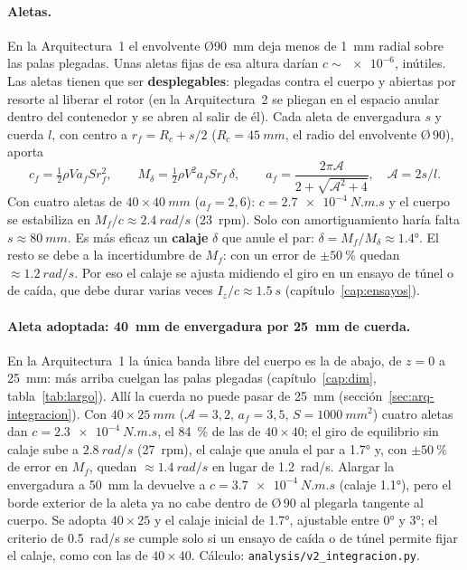\paragraph{Aletas.} En la Arquitectura~1 el envolvente Ø\SI{90}{mm} deja menos de
\SI{1}{mm} radial sobre las palas plegadas. Unas aletas fijas de esa altura darían
$c\sim\num{e-6}$, inútiles. Las aletas tienen que ser \textbf{desplegables}: plegadas contra
el cuerpo y abiertas por resorte al liberar el rotor (en la Arquitectura~2 se pliegan en el
espacio anular dentro del contenedor y se abren al salir de él). Cada aleta de envergadura $s$ y cuerda $l$, con centro a $r_f=R_c+s/2$ ($R_c=\SI{45}{mm}$, el radio del envolvente Ø\,90), aporta
\begin{equation}
  c_f=\tfrac12\rho V a_fSr_f^2,\qquad
  M_\delta=\tfrac12\rho V^2a_fSr_f\,\delta,\qquad
  a_f=\frac{2\pi\mathcal A}{2+\sqrt{\mathcal A^2+4}},\quad\mathcal A=2s/l .
\end{equation}
Con cuatro aletas de $40\times\SI{40}{mm}$ ($a_f=2{,}6$): $c=\SI{2.7e-4}{N.m.s}$ y el
cuerpo se estabiliza en $M_f/c\approx\SI{2.4}{rad/s}$ (23~rpm). Solo con amortiguamiento
haría falta $s\approx\SI{80}{mm}$. Es más eficaz un \textbf{calaje} $\delta$ que anule el
par: $\delta=M_f/M_\delta\approx\ang{1.4}$. El resto se debe a la incertidumbre de $M_f$:
con un error de $\pm\SI{50}{\percent}$ quedan $\approx\SI{1.2}{rad/s}$. Por eso el calaje
se ajusta midiendo el giro en un ensayo de túnel o de caída, que debe durar varias veces
$I_z/c\approx\SI{1.5}{s}$ (capítulo~\ref{cap:ensayos}).

\paragraph{Aleta adoptada: \SI{40}{mm} de envergadura por \SI{25}{mm} de cuerda.} En la
Arquitectura~1 la única banda libre del cuerpo es la de abajo, de $z=0$ a \SI{25}{mm}: más
arriba cuelgan las palas plegadas (capítulo~\ref{cap:dim}, tabla~\ref{tab:largo}). Allí la
cuerda no puede pasar de \SI{25}{mm} (sección~\ref{sec:arq-integracion}). Con $40\times\SI{25}{mm}$
($\mathcal A=3{,}2$, $a_f=3{,}5$, $S=\SI{1000}{mm^2}$) cuatro aletas dan
$c=\SI{2.3e-4}{N.m.s}$, el \SI{84}{\percent} de las de $40\times40$; el giro de equilibrio
sin calaje sube a $\SI{2.8}{rad/s}$ (27~rpm), el calaje que anula el par a \ang{1.7} y,
con $\pm\SI{50}{\percent}$ de error en $M_f$, quedan $\approx\SI{1.4}{rad/s}$ en lugar de
\SI{1.2}{rad/s}. Alargar la envergadura a \SI{50}{mm} la devuelve a $c=\SI{3.7e-4}{N.m.s}$
(calaje \ang{1.1}), pero el borde exterior de la aleta ya no cabe dentro de Ø\,90 al plegarla
tangente al cuerpo. Se adopta $40\times25$ y el calaje inicial de \ang{1.7}, ajustable entre
\ang{0} y \ang{3}; el criterio de \SI{0.5}{rad/s} se cumple solo si un ensayo de caída o de túnel
permite fijar el calaje, como con las de $40\times40$. Cálculo: \texttt{analysis/v2\_integracion.py}.

